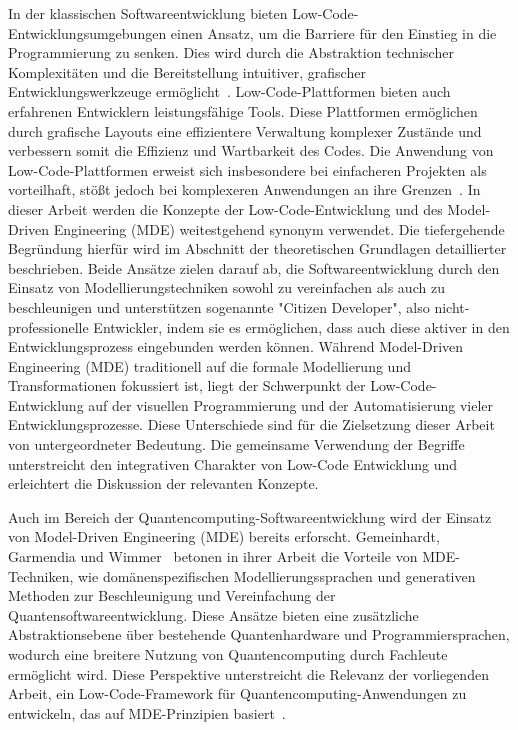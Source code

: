 In der klassischen Softwareentwicklung bieten Low-Code-Entwicklungsumgebungen einen Ansatz, 
um die Barriere für den Einstieg in die Programmierung zu senken. Dies wird durch die 
Abstraktion technischer Komplexitäten und die Bereitstellung intuitiver, grafischer 
Entwicklungswerkzeuge ermöglicht~\cite{Juhas2022}. Low-Code-Plattformen bieten auch 
erfahrenen Entwicklern leistungsfähige Tools. 
Diese Plattformen ermöglichen durch grafische Layouts eine effizientere Verwaltung komplexer 
Zustände und verbessern somit die Effizienz und Wartbarkeit des Codes. Die
Anwendung von Low-Code-Plattformen erweist sich insbesondere bei
einfacheren Projekten als vorteilhaft, stößt jedoch bei komplexeren
Anwendungen an ihre Grenzen~\cite{Buscher2022}. 
In dieser Arbeit werden die Konzepte der Low-Code-Entwicklung und des Model-Driven Engineering (MDE) 
weitestgehend synonym verwendet. Die tiefergehende Begründung hierfür 
wird im Abschnitt der theoretischen Grundlagen detaillierter beschrieben. 
Beide Ansätze zielen darauf ab, die Softwareentwicklung durch 
den Einsatz von Modellierungstechniken sowohl zu vereinfachen als auch zu beschleunigen und 
unterstützen sogenannte "Citizen Developer", also nicht-professionelle Entwickler, 
indem sie es ermöglichen, dass auch diese aktiver in den Entwicklungsprozess eingebunden werden können.
Während Model-Driven Engineering (MDE) traditionell auf die formale Modellierung und 
Transformationen fokussiert ist, liegt der Schwerpunkt der Low-Code-Entwicklung auf der 
visuellen Programmierung und der Automatisierung vieler Entwicklungsprozesse. 
Diese Unterschiede sind für die Zielsetzung dieser Arbeit von untergeordneter Bedeutung. 
Die gemeinsame Verwendung der Begriffe unterstreicht den integrativen Charakter 
von Low-Code Entwicklung und erleichtert die Diskussion der relevanten Konzepte. 

Auch im Bereich der Quantencomputing-Softwareentwicklung wird der Einsatz von 
Model-Driven Engineering (MDE) bereits erforscht. Gemeinhardt, Garmendia und Wimmer~\cite{gemeinhardt_2021} 
betonen in ihrer Arbeit die Vorteile von MDE-Techniken, wie domänenspezifischen 
Modellierungssprachen und generativen Methoden zur Beschleunigung und Vereinfachung 
der Quantensoftwareentwicklung. Diese Ansätze bieten eine zusätzliche Abstraktionsebene 
über bestehende Quantenhardware und Programmiersprachen, wodurch eine breitere Nutzung 
von Quantencomputing durch Fachleute ermöglicht wird. Diese Perspektive unterstreicht 
die Relevanz der vorliegenden Arbeit, ein Low-Code-Framework für Quantencomputing-Anwendungen 
zu entwickeln, das auf MDE-Prinzipien basiert~\cite{gemeinhardt_2021}.

